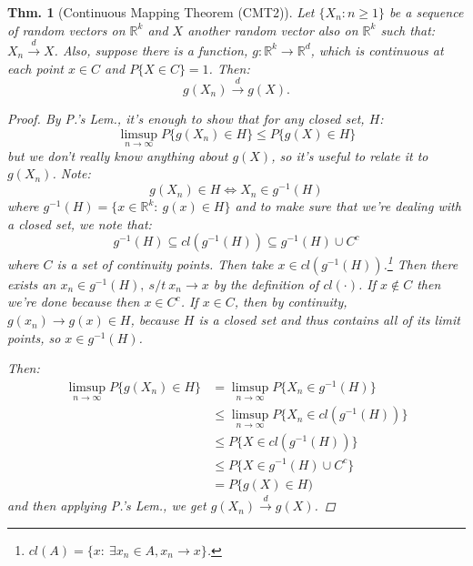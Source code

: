 \documentclass{tufte-book}
\theoremstyle{mytheoremstyle}
\newtheorem*{thm}{Thm.}
\theoremstyle{mylemstyle}
\theoremstyle{mydefstyle}
\begin{document}
\begin{thm}[Continuous Mapping Theorem (CMT2)] Let \(\{X_n: n \ge 1\}\) be a sequence of random vectors on \(\mathbb{R}^k\) and \(X\) another random vector also on \(\mathbb{R}^k\) such that: \(X_n \overset{d}{\rightarrow} X\). Also, suppose there is a function, \(g: \mathbb{R}^k \rightarrow \mathbb{R}^d\), which is continuous at each point \(x \in C\) and \(P\{X \in C\} = 1\). Then:
	\[g(X_n) \overset{d}{\rightarrow} g(X) \text{.} \]
	\begin{proof}
		By P.'s Lem., it's enough to show that for any closed set, \(H\):
			\[\limsup_{n \rightarrow \infty} P\{g(X_n) \in H\} \le P\{g(X) \in H\}\]
		but we don't really know anything about \(g(X)\), so it's useful to relate it to \(g(X_n)\). Note:
			\[g(X_n) \in H \iff X_n \in g^{-1}(H)\]
		where \(g^{-1}(H) = \{x \in \mathbb{R}^k:\ g(x) \in H\}\) and to make sure that we're dealing with a closed set, we note that:
			\[g^{-1}(H) \subseteq cl(g^{-1}(H)) \subseteq g^{-1}(H) \cup C^c\]
		where \(C\) is a set of continuity points. Then take \(x \in cl(g^{-1}(H))\).\footnote{\(cl(A) = \{x:\ \exists x_n \in A, x_n \rightarrow x\}\).} Then there exists an \(x_n \in g^{-1}(H),\ s/t\ x_n \rightarrow x\) by the definition of \(cl(\cdot)\). If \(x \not \in C\) then we're done because then \(x \in C^c\). If \(x \in C\), then by continuity, \(g(x_n) \rightarrow g(x) \in H\), because \(H\) is a closed set and thus contains all of its limit points, so \(x \in g^{-1}(H)\). 
		
		Then:
			\begin{align*}
				\limsup_{n\rightarrow \infty} P\{g(X_n) \in H\} & = \limsup_{n\rightarrow \infty} P\{X_n \in g^{-1}(H)\} \\
													& \le \limsup_{n\rightarrow \infty} P\{X_n \in cl(g^{-1}(H))\} \\
													& \le P\{X \in cl(g^{-1}(H))\} \\
													& \le P\{X \in g^{-1}(H) \cup C^c\} \\
													& = P\{g(X) \in H)
			\end{align*}
		and then applying P.'s Lem., we get \(g(X_n) \overset{d}{\rightarrow} g(X)\).
	\end{proof}
\end{thm}
\end{document}
